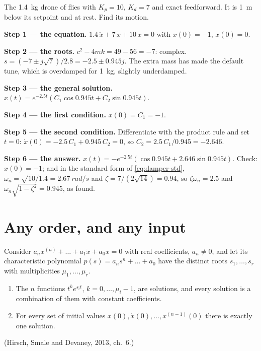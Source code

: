 \begin{example}
\label{ex:A-heavy}
The \SI{1.4}{kg} drone of  flies with $K_p = 10$, $K_d = 7$ and exact feedforward. It is \SI{1}{m} below its setpoint and at rest. Find its motion.

\textbf{Step 1 — the equation.} $1.4\,\ddot x + 7\,\dot x + 10\,x = 0$ with $x(0) = -1$, $\dot x(0) = 0$.

\textbf{Step 2 — the roots.} $c^2 - 4mk = 49 - 56 = -7$: complex. $s = (-7 \pm j\sqrt7)/2.8 = -2.5 \pm 0.945j$. The extra mass has made the default tune, which is overdamped for \SI{1}{kg}, slightly underdamped.

\textbf{Step 3 — the general solution.} $x(t) = e^{-2.5t}(C_1\cos 0.945t + C_2\sin 0.945t)$.

\textbf{Step 4 — the first condition.} $x(0) = C_1 = -1$.

\textbf{Step 5 — the second condition.} Differentiate with the product rule and set $t = 0$: $\dot x(0) = -2.5\,C_1 + 0.945\,C_2 = 0$, so $C_2 = 2.5\,C_1/0.945 = -2.646$.

\textbf{Step 6 — the answer.} $x(t) = -e^{-2.5t}(\cos 0.945t + 2.646\sin 0.945t)$. Check: $x(0) = -1$; and in the standard form of \cref{eq:damper-std}, $\omega_n = \sqrt{10/1.4} = \SI{2.67}{rad/s}$ and $\zeta = 7/(2\sqrt{14}) = 0.94$, so $\zeta\omega_n = 2.5$ and $\omega_n\sqrt{1 - \zeta^2} = 0.945$, as found.
\end{example}

\section{Any order, and any input}

\begin{theorem}
\label{thm:A-order-n}
Consider $a_n x^{(n)} + \dots + a_1\dot x + a_0 x = 0$ with real coefficients, $a_n \ne 0$, and let its characteristic polynomial $p(s) = a_ns^n + \dots + a_0$ have the distinct roots $s_1, \dots, s_r$ with multiplicities $\mu_1, \dots, \mu_r$.
\begin{enumerate}[label=(\roman*)]
  \item The $n$ functions $t^k e^{s_i t}$, $k = 0, \dots, \mu_i - 1$, are solutions, and every solution is a combination of them with constant coefficients.
  \item For every set of initial values $x(0), \dot x(0), \dots, x^{(n-1)}(0)$ there is exactly one solution.
\end{enumerate}
(Hirsch, Smale and Devaney, 2013, ch.~6.)
\end{theorem}

